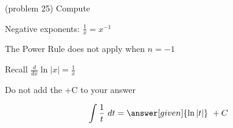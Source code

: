 \documentclass[handout]{ximera}
\begin{document}
\begin{problem}(problem 25)
Compute 

\begin{hint}
Negative exponents: $\frac{1}{x} = x^{-1}$
\end{hint}
\begin{hint}
The Power Rule does not apply when $n = -1$
\end{hint}
\begin{hint}
Recall $\frac{d}{dx} \ln|x| = \frac{1}{x}$
\end{hint}
\begin{hint}
\begin{center}
Do not add the +C to your answer
\end{center}
\end{hint}

\[
\int \frac{1}{t} \ dt =
\answer[given]{\ln|t|} \ + C
\]
\end{problem}
\end{document}
